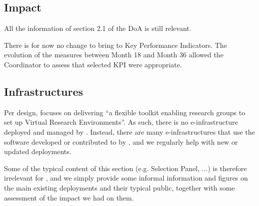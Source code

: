   \subsection{Impact}

  All the information of section 2.1 of the DoA is still relevant.

  There is for now no
  change to bring to Key Performance Indicators. The evolution of the measures between
  Month 18 and Month 36 allowed the Coordinator to assess that selected KPI were
  appropriate.

\subsection{Infrastructures}

\label{infrastructures}

Per design, \ODK focuses on delivering ``a flexible toolkit enabling
research groups to set up Virtual Research Environments''. As such,
there is no e-infrastructure deployed and managed by \ODK. Instead,
there are many e-infrastructures that use the software developed or
contributed to by \ODK, and we regularly help with new or updated
deployments.

Some of the typical content of this section (e.g. Selection Panel,
...) is therefore irrelevant for \ODK, and we simply provide some
informal information and figures on the main existing deployments and
their typical public, together with some assessment of the impact we
had on them.

